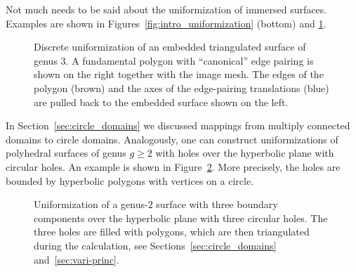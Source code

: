 \documentclass[Thesis]{subfiles}
\begin{document}
Not much needs to be said about the uniformization of immersed
surfaces. Examples are shown in Figures~\ref{fig:intro_uniformization}
(bottom) and \ref{fig:embedded_genus_3}.
\begin{figure}
\centering
{}
\caption{Discrete uniformization of an embedded triangulated surface
  of genus $3$. A fundamental polygon with ``canonical'' edge pairing
  is shown on the right together with the image mesh. The edges of the
  polygon (brown) and the axes of the edge-pairing translations (blue)
  are pulled back to the embedded surface shown on the left.}
\label{fig:embedded_genus_3}
\end{figure}
In Section~\ref{sec:circle_domains} we discussed mappings from
multiply connected domains to circle domains. Analogously, one can
construct uniformizations of polyhedral surfaces of genus $g\geq 2$
with holes over the hyperbolic plane with circular holes. An example
is shown in Figure~\ref{fig:hyperbolic_circle_domain}. More precisely,
the holes are bounded by hyperbolic polygons with vertices on a
circle. 
\begin{figure}
\centering
{}
\caption{ Uniformization of a genus-$2$ surface with three boundary
  components over the hyperbolic plane with three circular holes. The
  three holes are filled with polygons, which are then triangulated
  during the calculation, see Sections~\ref{sec:circle_domains}
  and~\ref{sec:vari-princ}.  }
\label{fig:hyperbolic_circle_domain}
\end{figure}
\end{document}
